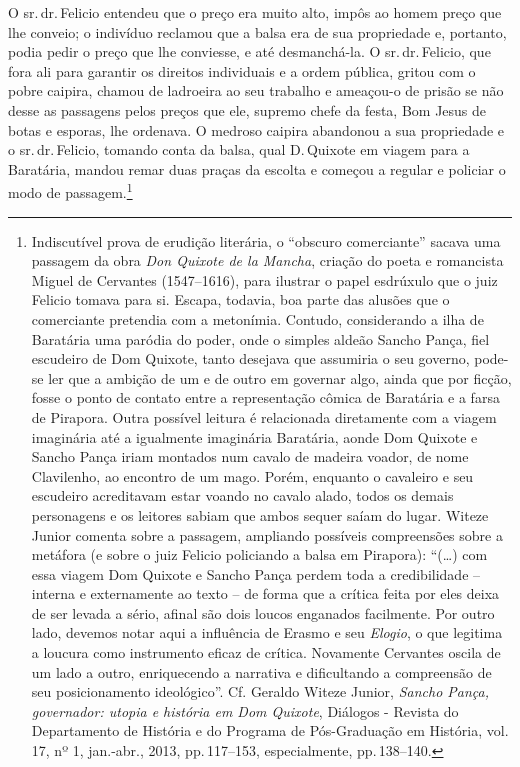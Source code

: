 O sr.\,dr.\,Felicio entendeu que o preço era muito alto, impôs ao homem
preço que lhe conveio; o indivíduo reclamou que a balsa era de sua
propriedade e, portanto, podia pedir o preço que lhe conviesse, e até
desmanchá-la. O sr.\,dr.\,Felicio, que fora ali para garantir os direitos
individuais e a ordem pública, gritou com o pobre caipira, chamou de
ladroeira ao seu trabalho e ameaçou-o de prisão se não desse as
passagens pelos preços que ele, supremo chefe da festa, Bom Jesus de
botas e esporas, lhe ordenava. O medroso caipira abandonou a sua
propriedade e o sr.\,dr.\,Felicio, tomando conta da balsa, qual D.\,Quixote
em viagem para a Baratária, mandou remar duas praças da escolta e
começou a regular e policiar o modo de passagem.\footnote{ Indiscutível
  prova de erudição literária, o ``obscuro comerciante'' sacava uma
  passagem da obra \emph{Don Quixote de la Mancha}, criação do poeta e
  romancista Miguel de Cervantes (1547--1616), para ilustrar o papel
  esdrúxulo que o juiz Felicio tomava para si. Escapa, todavia, boa
  parte das alusões que o comerciante pretendia com a metonímia.
  Contudo, considerando a ilha de Baratária uma paródia do poder, onde o
  simples aldeão Sancho Pança, fiel escudeiro de Dom Quixote, tanto
  desejava que assumiria o seu governo, pode-se ler que a ambição de um
  e de outro em governar algo, ainda que por ficção, fosse o ponto de
  contato entre a representação cômica de Baratária e a farsa de
  Pirapora. Outra possível leitura é relacionada diretamente com a
  viagem imaginária até a igualmente imaginária Baratária, aonde Dom
  Quixote e Sancho Pança iriam montados num cavalo de madeira voador, de
  nome Clavilenho, ao encontro de um mago. Porém, enquanto o cavaleiro e
  seu escudeiro acreditavam estar voando no cavalo alado, todos os
  demais personagens e os leitores sabiam que ambos sequer saíam do
  lugar. Witeze Junior comenta sobre a passagem, ampliando possíveis
  compreensões sobre a metáfora (e sobre o juiz Felicio policiando a
  balsa em Pirapora): ``(\ldots{}) com essa viagem Dom Quixote e Sancho Pança
  perdem toda a credibilidade -- interna e externamente ao texto -- de
  forma que a crítica feita por eles deixa de ser levada a sério, afinal
  são dois loucos enganados facilmente. Por outro lado, devemos notar
  aqui a influência de Erasmo e seu \emph{Elogio}, o que legitima a
  loucura como instrumento eficaz de crítica. Novamente Cervantes oscila
  de um lado a outro, enriquecendo a narrativa e dificultando a
  compreensão de seu posicionamento ideológico''. Cf. Geraldo Witeze
  Junior, \emph{Sancho Pança, governador: utopia e história em Dom
  Quixote}, Diálogos - Revista do Departamento de História e do Programa
  de Pós-Graduação em História, vol.\,17, nº 1, jan.-abr., 2013,
  pp.\,117--153, especialmente, pp.\,138--140.}


